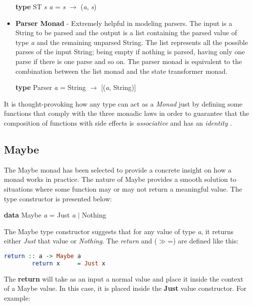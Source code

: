 \documentclass[a4paper, onecolumn]{article}
\begin{document}
\begin{itemize}
        \begin{center}
            \textbf{type} ST \textit{s a} = \textit{s} $\rightarrow$ (\textit{a}, \textit{s})
        \end{center}
        \item \textbf{Parser Monad} - Extremely helpful in modeling parsers. The input is a String to be parsed and the output is a list containing the parsed value of type \textit{a} and the remaining unparsed String. The list represents all the possible parses of the input String; being empty if nothing is parsed, having only one parse if there is one parse and so on. The parser monad is equivalent to the combination between the list monad and the state transformer monad.  
        \begin{center}
            \textbf{type} Parser \textit{a} = String $\rightarrow$ [(\textit{a}, String)] 
        \end{center}
    \end{itemize}
    It is thought-provoking how any type can act as a \textit{Monad} just by defining some functions that comply with the three monadic laws in order to guarantee that the composition of functions with side effects is \textit{associative} and has an \textit{identity} \cite{essenceFP}.
    
    \subsection{Maybe}
    The Maybe monad has been selected to provide a concrete insight on how a monad works in practice. The nature of Maybe provides a smooth solution to situations where some function may or may not return a meaningful value. The type constructor is presented below:
    
    \begin{center}
        \textbf{data} Maybe \textit{a} = Just \textit{a} $\vert$ Nothing 
    \end{center}
    The Maybe type constructor suggests that for any value of type \textit{a}, it returns either \textit{Just} that value or \textit{Nothing}. The \textit{return} and ($\gg$=) are defined like this:
    \begin{tcolorbox}
    \begin{lstlisting}[language=Haskell]
        return :: a -> Maybe a
        return x     = Just x 
    \end{lstlisting}
    \end{tcolorbox}
    The \textbf{return} will take as an input a normal value and place it inside the context of a Maybe value. In this case, it is placed inside the \textbf{Just} value constructor. For example: 
    
\end{document}
